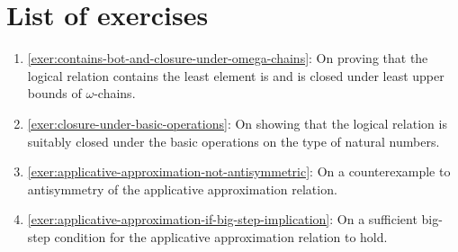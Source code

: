 \section{List of exercises}
\begin{enumerate}
\item \cref{exer:contains-bot-and-closure-under-omega-chains}: On proving that
  the logical relation contains the least element is and is closed under least
  upper bounds of \(\omega\)-chains.
\item \cref{exer:closure-under-basic-operations}: On showing that the logical
  relation is suitably closed under the basic operations on the type of natural
  numbers.
\item \cref{exer:applicative-approximation-not-antisymmetric}: On a
  counterexample to antisymmetry of the applicative approximation relation.
\item \cref{exer:applicative-approximation-if-big-step-implication}: On a
  sufficient big-step condition for the applicative approximation relation to
  hold.
\end{enumerate}

